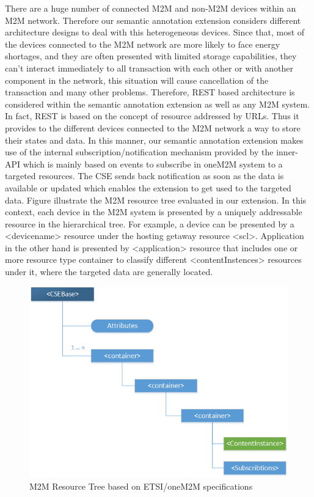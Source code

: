 There are a huge number of connected M2M and non-M2M devices within an M2M network. Therefore our semantic annotation extension considers different architecture designs to deal with this heterogeneous devices. Since that, most of the devices connected to the M2M network are more likely to face energy shortages, and they are often presented with limited storage capabilities, they can't interact immediately to all transaction with each other or with another component in the network, this situation will cause cancellation of the transaction and many other problems. Therefore, REST based architecture is considered within the semantic annotation extension as well as any M2M system. In fact, REST is based on the concept of resource addressed by URLs. Thus it provides to the different devices connected to the M2M network a way to store their states and data. In this manner, our semantic annotation extension makes use of the internal subscription/notification mechanism provided by the inner-API which is mainly based on events to subscribe in oneM2M system to a targeted resources. The CSE sends back notification as soon as the data is available or updated which enables the extension to get used to the targeted data. Figure illustrate the M2M resource tree evaluated in our extension.  In this context, each device in the M2M system is presented by a uniquely addressable resource in the hierarchical tree. For example, a device can be presented by a <device\textunderscore name> resource under the hosting getaway resource <scl>. Application in the other hand is presented by <application> resource that includes one or more resource type container to classify different <contentInstences> resources under it, where the targeted data are generally located.\par
\begin{figure}[htbp]
    \centering
    \includegraphics[width=1\textwidth]{resources/images/tree}
    \caption{M2M Resource Tree based on ETSI/oneM2M specifications}\label{fig:contrib1:goal}
\end{figure}
